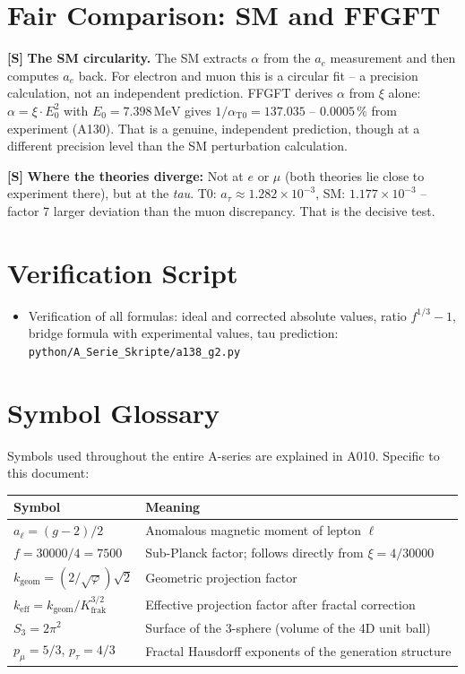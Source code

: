 \section{Fair Comparison: SM and FFGFT}

\textbf{[S]} \textbf{The SM circularity.} The SM extracts $\alpha$ from the
$a_e$ measurement and then computes $a_e$ back. For electron and muon this is a
circular fit -- a precision calculation, not an independent prediction. FFGFT
derives $\alpha$ from $\xi$ alone: $\alpha=\xi\cdot E_0^2$ with
$E_0=7{.}398\,\text{MeV}$ gives $1/\alpha_\text{T0}=137{.}035$ -- $0{.}0005\,\%$
from experiment (A130). That is a genuine, independent prediction, though at a
different precision level than the SM perturbation calculation.

\textbf{[S]} \textbf{Where the theories diverge:} Not at $e$ or $\mu$ (both
theories lie close to experiment there), but at the \emph{tau}. T0:
$a_\tau\approx1{.}282\times10^{-3}$, SM: $1{.}177\times10^{-3}$ -- factor 7
larger deviation than the muon discrepancy. That is the decisive test.

\section{Verification Script}

\begin{itemize}[leftmargin=2em,itemsep=2pt,topsep=2pt]
  \item Verification of all formulas: ideal and corrected absolute values, ratio
    $f^{1/3}-1$, bridge formula with experimental values, tau prediction:
    \texttt{python/A\_Serie\_Skripte/a138\_g2.py}
\end{itemize}

\section{Symbol Glossary}

Symbols used throughout the entire A-series are explained in A010.
Specific to this document:

\begin{center}
\renewcommand{\arraystretch}{1.3}
{\small\begin{tabular}{lp{9cm}}
\toprule
Symbol & Meaning \\
\midrule
$a_\ell = (g-2)/2$ & Anomalous magnetic moment of lepton $\ell$ \\
$f = 30000/4 = 7500$ & Sub-Planck factor; follows directly from $\xi=4/30000$ \\
$k_\text{geom} = (2/\sqrt\varphi)\sqrt2$ & Geometric projection factor \\
$k_\text{eff} = k_\text{geom}/K_\text{frak}^{3/2}$ & Effective projection factor
  after fractal correction \\
$S_3 = 2\pi^2$ & Surface of the 3-sphere (volume of the 4D unit ball) \\
$p_\mu = 5/3$, $p_\tau = 4/3$ & Fractal Hausdorff exponents of the
  generation structure \\
\bottomrule
\end{tabular}}
\renewcommand{\arraystretch}{1.0}
\end{center}

